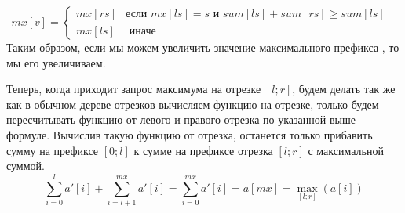 \documentclass{article}
\begin{document}
\begin{itemize}
\begin{equation*}
	mx[v] = 
	\begin{cases}
	mx[rs] & \text{если $mx[ls] = s$  и $sum[ls] + sum[rs] \geq sum[ls]$ } \\
	mx[ls] & \text{  иначе}
	\end{cases}
\end{equation*}
Таким образом, если мы можем увеличить значение максимального префикса , то мы его увеличиваем.

Теперь, когда приходит запрос максимума на отрезке $[l;r]$, будем делать так же как в обычном дереве отрезков вычисляем функцию на отрезке, только будем пересчитывать функцию от левого и правого отрезка по указанной выше формуле. Вычислив такую функцию от отрезка, останется только прибавить сумму на префиксе $[0;l]$ к сумме на префиксе отрезка $[l;r]$ с максимальной суммой. $$\sum_{i = 0}^{l}a'[i] + \sum_{i = l + 1}^{mx}a'[i] = \sum_{i = 0}^{mx}a'[i] = a[mx] = \max\limits_{[l;r]}(a[i])$$
\end{itemize}
\end{document}
